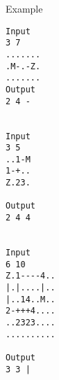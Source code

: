 Example
\begin{verbatim}
Input
3 7
.......
.M-.-Z.
.......
Output
2 4 -


Input
3 5
..1-M
1-+..
Z.23.

Output
2 4 4


Input
6 10
Z.1----4..
|.|....|..
|..14..M..
2-+++4....
..2323....
..........

Output
3 3 |
\end{verbatim}